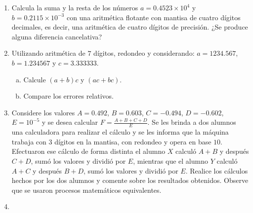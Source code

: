 \begin{frame}
  \begin{enumerate}
    \resume

    \item

          Calcula la suma y la resta de los números
          $a=0.4523\times 10^{4}$ y $b=0.2115\times 10^{-3}$
          con una aritmética flotante con mantisa de cuatro
          dígitos decimales, es decir, una aritmética de cuatro
          dígitos de precisión.
          ¿Se produce alguna diferencia cancelativa?

    \item

          Utilizando aritmética de $7$ dígitos, redondeo y
          considerando: $a=1234.567$, $b=1.234567$ y $c=3.333333$.

          \begin{multicols}{2}
            \begin{enumerate}[a)]
              \item

                    Calcule $\left(a+b\right)c$ y $\left(ac+bc\right)$.

              \item

                    Compare los errores relativos.
            \end{enumerate}
          \end{multicols}

    \item

          Considere los valores $A=0.492$, $B=0.603$, $C=-0.494$,
          $D=-0.602$, $E=10^{-5}$ y se desea calcular
          $F=\frac{A+B+C+D}{E}$.
          Se les brinda a dos alumnos una calculadora para realizar
          el cálculo y se les informa que la máquina trabaja con $3$
          dígitos en la mantisa, con redondeo y opera en base $10$.
          Efectuaron ese cálculo de forma distinta el alumno $X$
          calculó $A+B$ y después $C+D$, sumó los valores y dividió
          por $E$, mientras que el alumno $Y$ calculó $A+C$ y después
          $B+D$, sumó los valores y dividió por $E$.
          Realice los cálculos hechos por los dos alumnos y comente
          sobre los resultados obtenidos.
          Observe que se usaron procesos matemáticos equivalentes.

    \item


\end{enumerate}
\end{frame}
